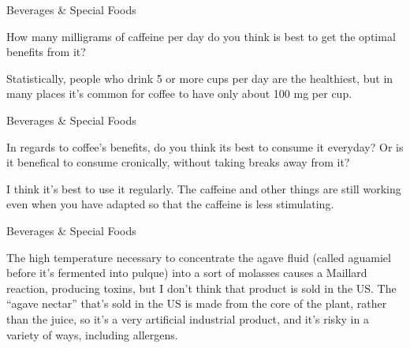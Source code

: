 \documentclass[11pt,oneside,openany,extrafontsizes]{memoir}
\begin{document}
\begin{qaexchange}{Beverages \& Special Foods}

    \begin{question}
        How many milligrams of caffeine per day do you think is best to get the optimal benefits from it?
    \end{question}

    \begin{answer}
      Statistically, people who drink 5 or more cups per day are the healthiest, but in many places it's common for coffee to have only about 100 mg per cup.
    \end{answer}
\end{qaexchange}

\begin{qaexchange}{Beverages \& Special Foods}

    \begin{question}
        In regards to coffee's benefits, do you think its best to consume it everyday? Or is it benefical to consume cronically, without taking breaks away from it?
    \end{question}

    \begin{answer}
      I think it's best to use it regularly. The caffeine and other things are still working even when you have adapted so that the caffeine is less stimulating.
    \end{answer}
\end{qaexchange}

\begin{standalonequote}{Beverages \& Special Foods}

    \begin{answer}
      The high temperature necessary to concentrate the agave fluid (called aguamiel before it's fermented into pulque) into a sort of molasses causes a Maillard reaction, producing toxins, but I don't think that product is sold in the US. The \enquote{agave nectar} that's sold in the US is made from the core of the plant, rather than the juice, so it's a very artificial industrial product, and it's risky in a variety of ways, including allergens. 
    \end{answer}
\end{standalonequote}
\end{document}
